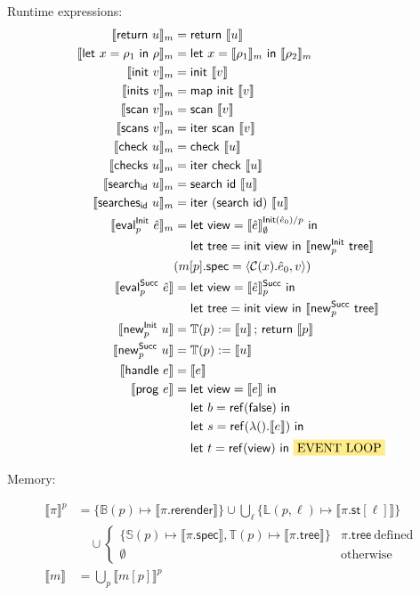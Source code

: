 \documentclass{article}
\newcommand{\mf}[1]{\mathsf{#1}}
\newcommand{\mc}[1]{\mathcal{#1}}
\newcommand{\semi}{\,;\,}
\newcommand{\hl}[1]{\colorbox{LightGoldenrod1}{#1}}
\newcommand{\llrr}[1]{\llbracket #1 \rrbracket}
\newcommand{\pair}[2]{\langle #1, #2 \rangle}
\newcommand{\C}{\mc{C}}
\newcommand{\elet}[3]{\mf{let}\ #1 = #2\ \mf{in}\ #3}
\newcommand{\eret}[1]{\mf{return}\ #1}
\newcommand{\eref}[1]{\mf{ref}(#1)}
\newcommand{\eset}[2]{#1 := #2}
\newcommand{\esearch}[2]{\mf{search}_\mf{#1}\ #2}
\newcommand{\esearches}[2]{\mf{searches}_\mf{#1}\ #2}
\newcommand{\eeval}[3]{\mf{eval}^{#1}_{#2}\ #3}
\newcommand{\enew}[3]{\mf{new}^{#1}_{#2}\ #3}
\newcommand{\ehdl}[1]{\mf{handle}\ #1}
\newcommand{\eprog}[1]{\mf{prog}\ #1}
\newcommand{\einit}[1]{\mf{init}\ #1}
\newcommand{\einits}[1]{\mf{inits}\ #1}
\newcommand{\escan}[1]{\mf{scan}\ #1}
\newcommand{\escans}[1]{\mf{scans}\ #1}
\newcommand{\echk}[1]{\mf{check}\ #1}
\newcommand{\echks}[1]{\mf{checks}\ #1}
\begin{document}
Runtime expressions:
\begin{align*}
\llrr{\eret{u}}_m &= \eret{\llrr{u}}\\
\llrr{\elet{x}{\rho_1}{\rho}}_m &= 
\elet{x}{\llrr{\rho_1}_m}{\llrr{\rho_2}_m}\\
\llrr{\einit{v}}_m &= \mf{init}\ \llrr{v}\\
\llrr{\einits{v}}_m &= \mf{map}\ \mf{init}\ \llrr{v}\\
\llrr{\escan{v}}_m &= \mf{scan}\ \llrr{v}\\
\llrr{\escans{v}}_m &= \mf{iter}\ \mf{scan}\ \llrr{v}\\
\llrr{\echk{u}}_m &= \mf{check}\ \llrr{u}\\
\llrr{\echks{u}}_m &= \mf{iter}\ \mf{check}\ \llrr{u}\\
\llrr{\esearch{id}{u}}_m &= \mf{search}\ \mf{id}\ \llrr{u}\\
\llrr{\esearches{id}{u}}_m &= \mf{iter}\ (\mf{search}\ \mf{id})\ \llrr{u}\\
\llrr{\eeval{\mf{Init}}{p}{\hat{e}}}_m
&= \elet{\mf{view}}{\llrr{\hat{e}}^{\mf{Init}(\hat{e}_0)/p}_\emptyset}{\\
  &\quad\ \elet{\mf{tree}}{\mf{init}\ \mf{view}}{
    \llrr{\enew{\mf{Init}}{p}{\mf{tree}}}
  }
}\\
&(m[p].\mf{spec} = \pair{\C(x).\hat{e}_0}{v})\\
\llrr{\eeval{\mf{Succ}}{p}{\hat{e}}}
&= \elet{\mf{view}}{\llrr{\hat{e}}^{\mf{Succ}}_p}{\\
  &\quad\ \elet{\mf{tree}}{\mf{init}\ \mf{view}}{
    \llrr{\enew{\mf{Succ}}{p}{\mf{tree}}}
  }
}\\
\llrr{\enew{\mf{Init}}{p}{u}}
&= \eset{\mathbb{T}(p)}{\llrr{u}} \semi \eret{\llrr{p}}\\
\llrr{\enew{\mf{Succ}}{p}{u}}
&= \eset{\mathbb{T}(p)}{\llrr{u}}\\
\llrr{\ehdl{e}} &= \llrr{e}\\
\llrr{\eprog{e}} &= \elet{\mf{view}}{\llrr{e}}{\\
  &\quad\ \elet{b}{\eref{\mf{false}}}{\\
    &\quad\ \elet{s}{\eref{\lambda ().\llrr{e}}}{\\
      &\quad\ \elet{t}{\eref{\mf{view}}}{
        \text{\hl{EVENT LOOP}}
      }
    }
  }
}
\end{align*}

Memory:

\begin{align*}\llrr{\pi}^p &= \{\mathbb{B}(p) \mapsto \llrr{\pi.\mf{rerender}}\}
\cup \bigcup_{\ell} \{\mathbb{L}(p, \ell) \mapsto \llrr{\pi.\mf{st}[\ell]}\}\\
&\quad\cup \begin{cases}
\{\mathbb{S}(p) \mapsto \llrr{\pi.\mf{spec}},
  \mathbb{T}(p) \mapsto \llrr{\pi.\mf{tree}}
\} &\pi.\mf{tree}\ \text{defined}\\
\emptyset &\text{otherwise}
\end{cases}\\
\llrr{m} &= \bigcup_p \llrr{m[p]}^p
\end{align*}
\end{document}
